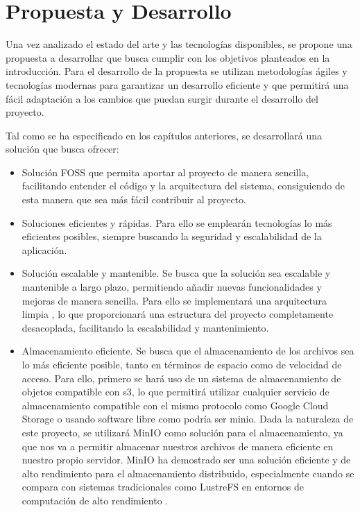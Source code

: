 \chapter{Propuesta y Desarrollo}
Una vez analizado el estado del arte y las tecnologías disponibles, se propone una propuesta a desarrollar que busca cumplir con los objetivos planteados en la introducción. Para el desarrollo de la propuesta se utilizan metodologías ágiles y tecnologías modernas para garantizar un desarrollo eficiente y que permitirá una fácil adaptación a los cambios que puedan surgir durante el desarrollo del proyecto.

Tal como se ha especificado en los capítulos anteriores, se desarrollará una solución que busca ofrecer:
\begin{itemize}
    \item Solución FOSS que permita aportar al proyecto de manera sencilla, facilitando entender el código y la arquitectura del sistema, consiguiendo de esta manera que sea más fácil contribuir al proyecto.
    \item Soluciones eficientes y rápidas. Para ello se emplearán tecnologías lo más eficientes posibles, siempre buscando la seguridad y escalabilidad de la aplicación.
    \item Solución escalable y mantenible. Se busca que la solución sea escalable y mantenible a largo plazo, permitiendo añadir nuevas funcionalidades y mejoras de manera sencilla. Para ello se implementará una arquitectura limpia \parencite{uncle-bob-clean-architecture}, lo que proporcionará una estructura del proyecto completamente desacoplada, facilitando la escalabilidad y mantenimiento.
    \item Almacenamiento eficiente. Se busca que el almacenamiento de los archivos sea lo más eficiente posible, tanto en términos de espacio como de velocidad de acceso.
        Para ello, primero se hará uso de un sistema de almacenamiento de objetos compatible con \gls{s3}, lo que permitirá utilizar cualquier servicio de almacenamiento compatible con el mismo protocolo como Google Cloud Storage o usando software libre como podría ser \gls{minio}.
        Dada la naturaleza de este proyecto, se utilizará MinIO como solución para el almacenamiento, ya que nos va a permitir almacenar nuestros archivos de manera eficiente en nuestro propio servidor. MinIO ha demostrado ser una solución eficiente y de alto rendimiento para el almacenamiento distribuido, especialmente cuando se compara con sistemas tradicionales como LustreFS en entornos de computación de alto rendimiento \parencite{astsatryan2025performance}.

\end{itemize}
